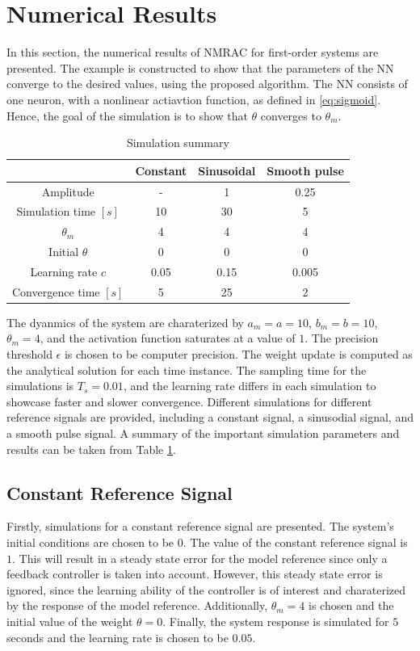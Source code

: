 \section{Numerical Results}
\label{sec:results}
In this section, the numerical results of NMRAC for first-order systems are presented. The example is constructed to show that the parameters of the NN converge to the desired values, using the proposed algorithm. The NN consists of one neuron, with a nonlinear actiavtion function, as defined in \eqref{eq:sigmoid}. Hence, the goal of the simulation is to show that $\theta$ converges to $\theta_m$.

\begin{table}
    \centering
    \caption{Simulation summary}\label{tab:sim-settings}
    \begin{tabular}{ c c c c } 
            \hline
            & Constant  & Sinusoidal  & Smooth pulse \\
            \hline  
            Amplitude & - & 1 & 0.25 \\
            Simulation time $[s]$  & 10 & 30 & 5 \\
            $\theta_m$ & 4 & 4 & 4 \\
            Initial $\theta$ & 0 & 0 & 0 \\
            Learning rate $c$ & 0.05 & 0.15 & 0.005\\
            Convergence time $[s]$ & 5 & 25 & 2 \\
            \hline
        \end{tabular}
\end{table}

The dyanmics of the system are charaterized by $a_m=a=10$, $b_m=b=10$, $\theta_m=4$, and the activation function saturates at a value of $1$. The precision threshold $\epsilon$ is chosen to be computer precision. The weight update is computed as the analytical solution for each time instance. The sampling time for the simulations is $T_s=0.01$, and the learning rate differs in each simulation to showcase faster and slower convergence. Different simulations for different reference signals are provided, including a constant signal, a sinusodial signal, and a smooth pulse signal. A summary of the important simulation parameters and results can be taken from Table \ref{tab:sim-settings}.

\subsection{Constant Reference Signal}
Firstly, simulations for a constant reference signal are presented. The system's initial conditions are chosen to be $0$. The value of the constant reference signal is $1$. This will result in a steady state error for the model reference since only a feedback controller is taken into account. However, this steady state error is ignored, since the learning ability of the controller is of interest and charaterized by the response of the model reference. Additionally, $\theta_m=4$ is chosen and the initial value of the weight $\theta=0$. Finally, the system response is simulated for $5$ seconds and the learning rate is chosen to be $0.05$.


